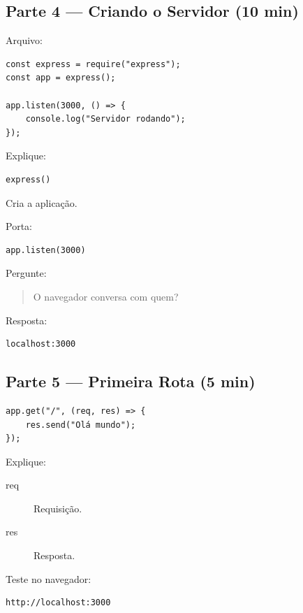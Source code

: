 \documentclass[a4paper,12pt]{article}
\begin{document}
\subsection{Parte 4 --- Criando o Servidor (10 min)}

Arquivo:

\begin{verbatim}
const express = require("express");
const app = express();

app.listen(3000, () => {
    console.log("Servidor rodando");
});
\end{verbatim}

Explique:

\begin{verbatim}
express()
\end{verbatim}

Cria a aplicação.

Porta:

\begin{verbatim}
app.listen(3000)
\end{verbatim}

Pergunte:

\begin{quote}
O navegador conversa com quem?
\end{quote}

Resposta:

\begin{verbatim}
localhost:3000
\end{verbatim}

\subsection{Parte 5 --- Primeira Rota (5 min)}

\begin{verbatim}
app.get("/", (req, res) => {
    res.send("Olá mundo");
});
\end{verbatim}

Explique:

\begin{description}
    \item[req] Requisição.
    \item[res] Resposta.
\end{description}

Teste no navegador:

\begin{verbatim}
http://localhost:3000
\end{verbatim}
\end{document}
